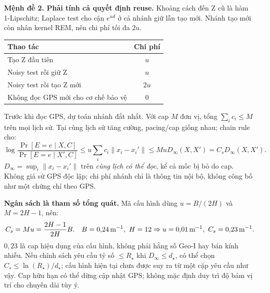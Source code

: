 \documentclass[10pt,a4paper]{article}
\begin{document}
\textbf{Mệnh đề 2. Phải tính cả quyết định reuse.} Khoảng cách đến Z cũ là hàm 1-Lipschitz;
Laplace test cho cận $e^{ud}$ ở cả nhánh giữ lẫn tạo mới. Nhánh tạo mới còn nhân kernel REM,
nên chi phí tối đa $2u$.
\begin{center}
\begin{tabular}{@{}lc@{}}\toprule
\textbf{Thao tác} & \textbf{Chi phí}\\\midrule
Tạo Z đầu tiên & $u$\\
Noisy test rồi giữ Z & $u$\\
Noisy test rồi tạo Z mới & $2u$\\
Không đọc GPS mới cho cơ chế bảo vệ & $0$\\\bottomrule
\end{tabular}
\end{center}
Trước khi đọc GPS, dự toán nhánh đắt nhất. Với cap $M$ đơn vị, tổng $\sum_i c_i\le M$ trên mọi lịch sử.
Tại cùng lịch sử tăng cường, pacing/cap giống nhau; chain rule cho:
\begin{equation}
\log\frac{\Pr[E=e\mid X,C]}{\Pr[E=e\mid X',C]}
\le u\sum_i c_i\|x_i-x_i'\|
\le MuD_\infty(X,X')=C_sD_\infty(X,X').
\label{eq:geosession}
\end{equation}
$D_\infty=\sup_i\|x_i-x_i'\|$ trên \emph{cùng lịch có thể đọc}, kể cả mốc bị bỏ do cap.
Không giả sử GPS độc lập; chi phí nhánh chỉ là thông tin nội bộ, không công bố như một chứng chỉ theo GPS.

\textbf{Ngân sách là tham số tổng quát.} Mã cấu hình dùng $u=B/(2H)$ và $M=2H-1$, nên:
\begin{equation}
C_s=Mu=\frac{2H-1}{2H}B.
\quad B=0{,}24\,\mathrm m^{-1},\ H=12
\Rightarrow u=0{,}01\,\mathrm m^{-1},\ C_s=0{,}23\,\mathrm m^{-1}.
\label{eq:budget}
\end{equation}
$0{,}23$ là cap hiệu dụng của cấu hình, không phải hằng số Geo-I hay bán kính nhiễu.
Nếu chính sách yêu cầu tỷ số $\le R_\star$ khi $D_\infty\le d_\star$, có thể chọn
$C_s\le\ln(R_\star)/d_\star$; cấu hình hiện tại chưa được suy ra từ một cặp yêu cầu như vậy.
Cap hữu hạn có thể dừng cập nhật GPS; không mặc định duy trì độ bám vị trí cho chuyến dài tùy ý.
\end{document}
